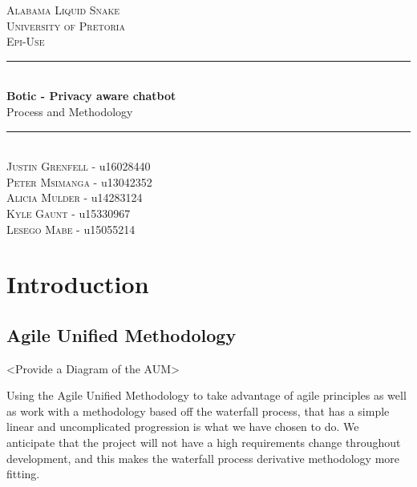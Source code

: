 \documentclass[11pt]{article}
\begin{document}
\renewcommand{\familydefault}{\sfdefault}
\begin{titlepage}
	\newcommand{\HRule}{\rule{\linewidth}{0.5mm}}
	\begin{center}
		            
		\textsc{\LARGE Alabama Liquid Snake}\\[0.8cm]
		\textsc{\Large University of Pretoria}\\[0.5cm]
		\textsc{\large Epi-Use}\\[0.5cm]
		    
		\HRule\\[0.4cm]
		    	
		{\huge\bfseries Botic - Privacy aware chatbot}\\[0.2cm]
		    	
		{\huge Process and Methodology}\\[0.2cm]
		
		\HRule\\[0.5cm]
		
		\textsc{Justin Grenfell} - u16028440 \\[0cm]
		\textsc{Peter Msimanga} - u13042352 \\[0cm]
		\textsc{Alicia Mulder} - u14283124 \\[0cm]
		\textsc{Kyle Gaunt} - u15330967 \\[0cm]
		\textsc{Lesego Mabe} - u15055214 \\[0cm]
		    
	\end{center}
\end{titlepage}
\tableofcontents
\newpage

\section{Introduction}
\subsection{Agile Unified Methodology}

<Provide a Diagram of the AUM>

Using the Agile Unified Methodology to take advantage of agile principles as well as work with a methodology based off the
waterfall process, that has a simple linear and uncomplicated progression is what we have chosen to do. We anticipate that
the project will not have a high requirements change throughout development, and this makes the waterfall process derivative
methodology more fitting.
\end{document}
